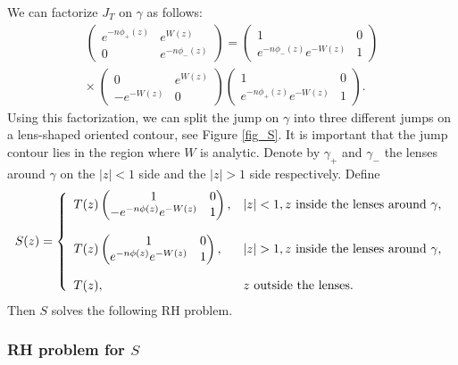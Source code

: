\documentclass[11pt,fleqn]{article}
\numberwithin{equation}{section}
\begin{document}
We can factorize $J_{T}$ on $\gamma$ as follows:
\begin{multline}
\begin{pmatrix}
e^{-n\phi_+(z)} & e^{W(z)} \\
0 & e^{-n\phi_-(z)}
\end{pmatrix} = \begin{pmatrix}
1 & 0 \\ e^{-n\phi_-(z)}e^{-W(z)} & 1
\end{pmatrix}\\
\times\ \begin{pmatrix}
0 & e^{W(z)} \\ -e^{-W(z)} & 0
\end{pmatrix}\begin{pmatrix}
1 & 0 \\ e^{-n\phi_+(z)}e^{-W(z)} & 1
\end{pmatrix}.
\end{multline}
Using this factorization, we can split the jump on $\gamma$ into three different jumps on a lens-shaped oriented contour, see Figure \ref{fig_S}. It is important that the jump contour lies in the region where $W$ is analytic.
Denote by $\gamma_{+}$ and $\gamma_{-}$ the lenses around $\gamma$ on the $|z|<1$ side and the $|z|>1$ side respectively. Define
\begin{equation}\label{def S}
S(z) = \left\{ \begin{array}{l l}

T(z) \begin{pmatrix}
1 & 0 \\ -e^{-n\phi(z)}e^{-W(z)} & 1
\end{pmatrix}, &
|z|<1, z \mbox{ inside the lenses around }\gamma, \\[0.6cm]
T(z) \begin{pmatrix}
1 & 0 \\ e^{-n\phi(z)}e^{-W(z)} & 1
\end{pmatrix}, &
|z|>1, z \mbox{ inside the lenses around }\gamma, \\[0.6cm]

T(z),  &   z \mbox{ outside the lenses.}                 \\

\end{array} \right.
\end{equation}
Then $S$ solves the following RH problem.
\subsubsection*{RH problem for $S$}
\end{document}
